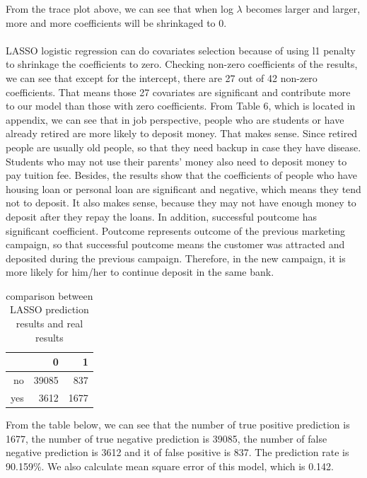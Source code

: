 \documentclass{article} %
\begin{document}
From the trace plot above, we can see that when log $\lambda$ becomes larger and larger, more and more coefficients will be shrinkaged to 0.\\\\
LASSO logistic regression can do covariates selection because of using l1 penalty to shrinkage the coefficients to zero. Checking non-zero coefficients of the results, we can see that except for the intercept, there are 27 out of 42 non-zero coefficients. That means those 27 covariates are significant and contribute more to our model than those with zero coefficients. From Table 6, which is located in appendix, we can see that in job perspective, people who are students or have already retired are more likely to deposit money. That makes sense. Since retired people are usually old people, so that they need backup in case they have disease. Students who may not use their parents' money also need to deposit money to pay tuition fee. Besides, the results show that the coefficients of people who have housing loan or personal loan are significant and negative, which means they tend not to deposit. It also makes sense, because they may not have enough money to deposit after they repay the loans. In addition, successful poutcome has significant coefficient. Poutcome represents outcome of the previous marketing campaign, so that successful poutcome means the customer was attracted and deposited during the previous campaign. Therefore, in the new campaign, it is more likely for him/her to continue deposit in the same bank.
\begin{table}[ht]
\caption{comparison between LASSO prediction results and real results}
\centering
\begin{tabular}{rrr}
  \hline
 & 0 & 1 \\ 
  \hline
no & 39085 & 837 \\ 
  yes & 3612 & 1677 \\ 
   \hline
\end{tabular}
\end{table}
From the table below, we can see that the number of true positive prediction is 1677, the number of true negative prediction is 39085, the number of false negative prediction is 3612 and it of false positive is 837. The prediction rate is 90.159\%. We also calculate mean square error of this model, which is 0.142.
\end{document}
